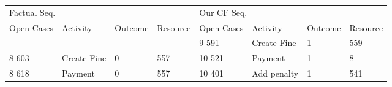 \begin{tabular}{llllllll}
\toprule
\multicolumn{4}{l}{Factual Seq.} & \multicolumn{4}{l}{Our CF Seq.} \\
Open Cases & Activity & Outcome & Resource & Open Cases & Activity & Outcome & Resource \\
\midrule
 &  &  &  & 9 591 & Create Fine & 1 & 559 \\
8 603 & Create Fine & 0 & 557 & 10 521 & Payment & 1 & 8 \\
8 618 & Payment & 0 & 557 & 10 401 & Add penalty & 1 & 541 \\
\bottomrule
\end{tabular}
